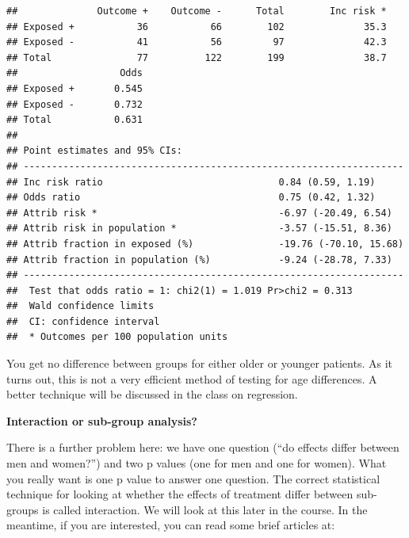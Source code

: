 \documentclass[]{book}
\newenvironment{Shaded}{\begin{snugshade}}{\end{snugshade}}
\newcommand{\CommentTok}[1]{\textcolor[rgb]{0.56,0.35,0.01}{\textit{#1}}}
\newcommand{\DataTypeTok}[1]{\textcolor[rgb]{0.13,0.29,0.53}{#1}}
\newcommand{\DecValTok}[1]{\textcolor[rgb]{0.00,0.00,0.81}{#1}}
\newcommand{\KeywordTok}[1]{\textcolor[rgb]{0.13,0.29,0.53}{\textbf{#1}}}
\newcommand{\NormalTok}[1]{#1}
\newcommand{\OperatorTok}[1]{\textcolor[rgb]{0.81,0.36,0.00}{\textbf{#1}}}
\begin{document}
\begin{Shaded}
\end{Shaded}

\begin{verbatim}
##              Outcome +    Outcome -      Total        Inc risk *
## Exposed +           36           66        102              35.3
## Exposed -           41           56         97              42.3
## Total               77          122        199              38.7
##                  Odds
## Exposed +       0.545
## Exposed -       0.732
## Total           0.631
## 
## Point estimates and 95% CIs:
## -------------------------------------------------------------------
## Inc risk ratio                               0.84 (0.59, 1.19)
## Odds ratio                                   0.75 (0.42, 1.32)
## Attrib risk *                                -6.97 (-20.49, 6.54)
## Attrib risk in population *                  -3.57 (-15.51, 8.36)
## Attrib fraction in exposed (%)               -19.76 (-70.10, 15.68)
## Attrib fraction in population (%)            -9.24 (-28.78, 7.33)
## -------------------------------------------------------------------
##  Test that odds ratio = 1: chi2(1) = 1.019 Pr>chi2 = 0.313
##  Wald confidence limits
##  CI: confidence interval
##  * Outcomes per 100 population units
\end{verbatim}

You get no difference between groups for either older or younger patients. As it turns out, this is not a very efficient method of testing for age differences. A better technique will be discussed in the class on regression.

\textbf{Interaction or sub-group analysis?}

There is a further problem here: we have one question (``do effects differ between men and women?'') and two p values (one for men and one for women). What you really want is one p value to answer one question. The correct statistical technique for looking at whether the effects of treatment differ between sub-groups is called interaction. We will look at this later in the course. In the meantime, if you are interested, you can read some brief articles at:
\end{document}

